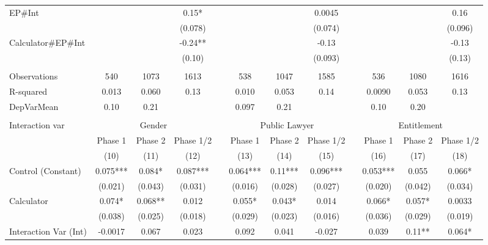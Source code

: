 \begin{tabular}{lccccccccccc}
EP\#Int &       &       & 0.15* &       &       &       & 0.0045 &       &       &       & 0.16 \\
      &       &       & (0.078) &       &       &       & (0.074) &       &       &       & (0.096) \\
Calculator\#EP\#Int &       &       & -0.24** &       &       &       & -0.13 &       &       &       & -0.13 \\
      &       &       & (0.10) &       &       &       & (0.093) &       &       &       & (0.13) \\
      &       &       &       &       &       &       &       &       &       &       &  \\
\midrule
Observations & 540   & 1073  & 1613  &       & 538   & 1047  & 1585  &       & 536   & 1080  & 1616 \\
R-squared & 0.013 & 0.060 & 0.13  &       & 0.010 & 0.053 & 0.14  &       & 0.0090 & 0.053 & 0.13 \\
DepVarMean & 0.10  & 0.21  &       &       & 0.097 & 0.21  &       &       & 0.10  & 0.20  &  \\
\midrule
\midrule
      &       &       &       &       &       &       &       &       &       &       &  \\
\midrule
Interaction var & \multicolumn{3}{c}{Gender} &       & \multicolumn{3}{c}{Public Lawyer} &       & \multicolumn{3}{c}{Entitlement} \\
\cmidrule{2-4}\cmidrule{6-8}\cmidrule{10-12}      & Phase 1 & Phase 2 & Phase 1/2 &       & Phase 1 & Phase 2 & Phase 1/2 &       & Phase 1 & Phase 2 & Phase 1/2 \\
\midrule
\midrule
      & (10)  & (11)  & (12)  &       & (13)  & (14)  & (15)  &       & (16)  & (17)  & (18) \\
\midrule
\midrule
Control (Constant) & 0.075*** & 0.084* & 0.087*** &       & 0.064*** & 0.11*** & 0.096*** &       & 0.053*** & 0.055 & 0.066* \\
      & (0.021) & (0.043) & (0.031) &       & (0.016) & (0.028) & (0.027) &       & (0.020) & (0.042) & (0.034) \\
Calculator & 0.074* & 0.068** & 0.012 &       & 0.055* & 0.043* & 0.014 &       & 0.066* & 0.057* & 0.0033 \\
      & (0.038) & (0.025) & (0.018) &       & (0.029) & (0.023) & (0.016) &       & (0.036) & (0.029) & (0.019) \\
Interaction Var (Int) & -0.0017 & 0.067 & 0.023 &       & 0.092 & 0.041 & -0.027 &       & 0.039 & 0.11** & 0.064* \\

\end{tabular}
